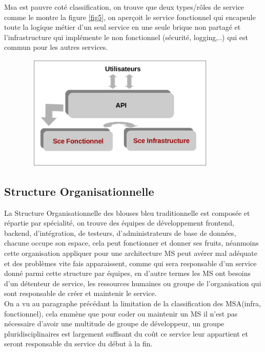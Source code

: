 \documentclass[12pt, a4paper, openany]{report}
\begin{document}
   Msa est pauvre coté classification, on trouve que deux types/rôles de service comme le montre la figure \ref{fig5}, on aperçoit le service fonctionnel qui encapsule toute la logique métier d'un seul service en une seule brique non partagé et l'infrastructure qui implémente le non fonctionnel (sécurité, logging,..) qui est commun pour les autres services.

   \begin{center}
     \includegraphics[width=12cm, height=5.5cm]{classif_msa_5.png}
     \label{fig5}
   \end{center}
   
  
  \subsection{Structure Organisationnelle} %
   
   La Structure Organisationnelle des blouses bleu traditionnelle est composée et répartie par spécialité, on trouve des équipes de développement frontend, backend, d'intégration, de testeurs, d'administrateurs de base de données, chacune occupe son espace, cela peut fonctionner et donner ses fruits, néanmoins cette organisation appliquer pour une architecture MS peut avérer mal adéquate et des problèmes vite fais apparaissent, comme qui sera responsable d'un service donné parmi cette structure par équipes, en d'autre termes les MS ont besoins d'un détenteur de service, les ressources humaines ou groupe de l’organisation qui sont responsable de créer et maintenir le service.\\
   
   On a vu au paragraphe précédant la limitation de la classification des MSA(infra, fonctionnel), cela emmène que pour coder ou maintenir un MS il n'est pas nécessaire d'avoir une multitude de groupe de développeur, un groupe pluridisciplinaires est largement suffisant du coût ce service leur appartient et seront responsable du service du début à la fin.
   
\end{document}

